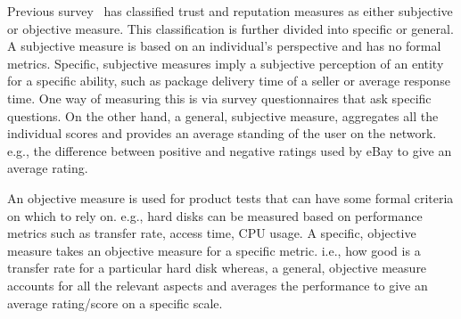 Previous survey~\cite{ josang2007survey} has classified trust and reputation
measures as either subjective or objective measure. This classification is
further divided into specific or general. A subjective measure is based on an
individual's perspective and has no formal metrics. Specific, subjective
measures imply a subjective perception of an entity for a specific ability,
such as package delivery time of a seller or average response time. One way of
measuring this is via survey questionnaires that ask specific questions. On the
other hand, a general, subjective measure, aggregates all the individual scores
and provides an average standing of the user on the network. e.g., the
difference between positive and negative ratings used by eBay to give an
average rating. \par

An objective measure is used for product tests that can have some formal
criteria on which to rely on. e.g., hard disks can be measured based on
performance metrics such as transfer rate, access time, CPU usage. A specific,
objective measure takes an objective measure for a specific metric. i.e., how
good is a transfer rate for a particular hard disk whereas, a general,
objective measure accounts for all the relevant aspects and averages the
performance to give an average rating/score on a specific scale. \par

